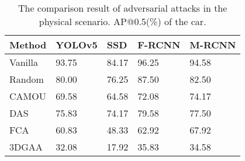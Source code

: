 \begin{table}
    \centering
    \caption{The comparison result of adversarial attacks in the physical scenario. AP@0.5(\%) of the car.}
    \label{tab:physical comparison}
    \begin{tabularx}{\columnwidth}{@{}lXXXX@{}}
         \toprule
         Method & YOLOv5 & SSD & F-RCNN & M-RCNN \\
         \midrule
         Vanilla & 93.75 & 84.17 & 96.25 & 94.58 \\ 
         Random & 80.00 & 76.25 & 87.50 & 82.50 \\
         CAMOU & 69.58 & 64.58 & 72.08 & 74.17 \\
         DAS & 75.83 & 74.17 & 79.58 & 77.50 \\
         FCA & 60.83 & 48.33 & 62.92 & 67.92 \\
         3DGAA & 32.08 & 17.92 & 35.83 & 34.58 \\
         \bottomrule
    \end{tabularx}

\end{table}